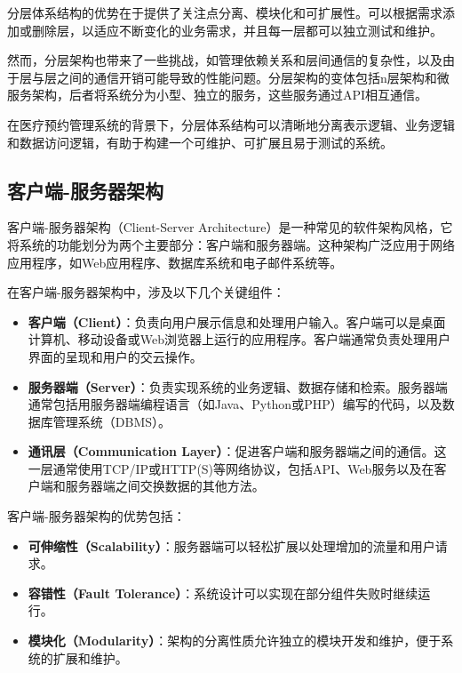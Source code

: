 分层体系结构的优势在于提供了关注点分离、模块化和可扩展性。可以根据需求添加或删除层，以适应不断变化的业务需求，并且每一层都可以独立测试和维护。

然而，分层架构也带来了一些挑战，如管理依赖关系和层间通信的复杂性，以及由于层与层之间的通信开销可能导致的性能问题。分层架构的变体包括n层架构和微服务架构，后者将系统分为小型、独立的服务，这些服务通过API相互通信。

在医疗预约管理系统的背景下，分层体系结构可以清晰地分离表示逻辑、业务逻辑和数据访问逻辑，有助于构建一个可维护、可扩展且易于测试的系统。


\subsection{客户端-服务器架构}
客户端-服务器架构（Client-Server Architecture）是一种常见的软件架构风格，它将系统的功能划分为两个主要部分：客户端和服务器端。这种架构广泛应用于网络应用程序，如Web应用程序、数据库系统和电子邮件系统等。

在客户端-服务器架构中，涉及以下几个关键组件：

\begin{itemize}
	\item \textbf{客户端（Client）}：负责向用户展示信息和处理用户输入。客户端可以是桌面计算机、移动设备或Web浏览器上运行的应用程序。客户端通常负责处理用户界面的呈现和用户的交云操作。
	
	\item \textbf{服务器端（Server）}：负责实现系统的业务逻辑、数据存储和检索。服务器端通常包括用服务器端编程语言（如Java、Python或PHP）编写的代码，以及数据库管理系统（DBMS）。
	
	\item \textbf{通讯层（Communication Layer）}：促进客户端和服务器端之间的通信。这一层通常使用TCP/IP或HTTP(S)等网络协议，包括API、Web服务以及在客户端和服务器端之间交换数据的其他方法。
\end{itemize}

客户端-服务器架构的优势包括：

\begin{itemize}
	\item \textbf{可伸缩性（Scalability）}：服务器端可以轻松扩展以处理增加的流量和用户请求。
	\item \textbf{容错性（Fault Tolerance）}：系统设计可以实现在部分组件失败时继续运行。
	\item \textbf{模块化（Modularity）}：架构的分离性质允许独立的模块开发和维护，便于系统的扩展和维护。
\end{itemize}

